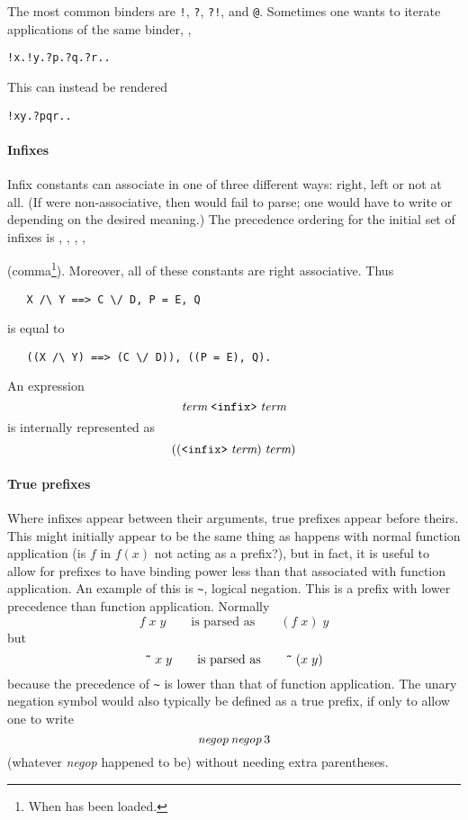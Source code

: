 {The most common binders are \verb+!+, \verb+?+, \verb+?!+, and
\verb+@+. Sometimes one wants to iterate applications of the same
binder, \eg,
\begin{alltt}
   !x. !y. ?p. ?q. ?r. \term.
\end{alltt}
This can instead be rendered
\begin{alltt}
   !x y. ?p q r. \term.
\end{alltt}

\paragraph{Infixes}

Infix constants can associate in one of three different ways: right,
left or not at all.  (If \holtxt{+} were non-associative, then
 would fail to parse; one would have to write
 or  depending on the desired
meaning.)  The precedence ordering for the initial set of infixes is
\holtxt{/\bs}, \holtxt{\bs/}, \holtxt{==>}, \holtxt{=},
\begin{Large}\holtxt{,}\end{Large} (comma\footnote{When
   has been loaded.}). Moreover, all of these
constants are right associative. Thus
\begin{verbatim}
   X /\ Y ==> C \/ D, P = E, Q
\end{verbatim}
 is equal to
\begin{verbatim}
   ((X /\ Y) ==> (C \/ D)), ((P = E), Q).
\end{verbatim}

\noindent An expression
\[
\term \; \holtxt{<infix>}\; \term
\]
is internally represented as
\[
((\holtxt{<infix>}\; \term)\; \term)
\]

\paragraph{True prefixes}

Where infixes appear between their arguments, true prefixes appear
before theirs.  This might initially appear to be the same thing as
happens with normal function application (is $f$ in $f(x)$ not acting
as a prefix?), but in fact, it is useful to allow for prefixes to have
binding power less than that associated with function application.  An
example of this is \verb+~+, logical negation.  This is a prefix with
lower precedence than function application.  Normally
\[
   f\;x\; y\qquad \mbox{is parsed as}\qquad (f\; x)\; y
\] but \[
  \holtxt{\~{}}\; x\; y\qquad\mbox{is parsed as}\qquad
  \holtxt{\~{}}\; (x\; y)
\] because the precedence of \verb+~+ is lower than that of function
application.  The unary negation symbol would also typically be
defined as a true prefix, if only to allow one to write \[ {\it
  negop}\,{\it negop}\,3
\] (whatever {\it negop} happened to be) without needing extra parentheses.

}
